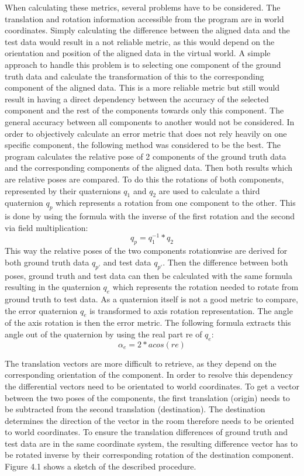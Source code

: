 \documentclass[hyperref,english,bachelorofscience,bibnum,twoside]{cgvpub}
\begin{document}
When calculating these metrics, several problems have to be considered. The translation and rotation information accessible from the program are in world coordinates. Simply calculating the difference between the aligned data and the test data would result in a not reliable metric, as this would depend on the orientation and position of the aligned data in the virtual world. A simple approach to handle this problem is to selecting one component of the ground truth data and calculate the transformation of this to the corresponding component of the aligned data. This is a more reliable metric but still would result in having a direct dependency between the accuracy of the selected component and the rest of the components towards only this component. The general accuracy between all components to another would not be considered. 
In order to objectively calculate an error metric that does not rely heavily on one specific component, the following method was considered to be the best. The program calculates the relative pose of 2 components of the ground truth data and the corresponding components of the aligned data. Then both results which are relative poses are compared. 
To do this the rotations of both components, represented by their quaternions $q_1$ and $q_2$ are used to calculate a third quaternion $q_p$ which represents a rotation from one component to the other. This is done by using the formula with the inverse of the first rotation and the second via field multiplication:
\[
q_p = q_1^{-1} * q_2
\]
This way the relative poses of the two components rotationwise are derived for both ground truth data $q_{p'}$ and test data $q_{p'}$. Then the difference between both poses, ground truth and test data can then be calculated with the same formula resulting in the quaternion $q_e$ which represents the rotation needed to rotate from ground truth to test data. As a quaternion itself is not a good metric to compare, the error quaternion $q_e$ is transformed to axis rotation representation. The angle of the axis rotation is then the error metric. 
The following formula extracts this angle out of the quaternion by using the real part re of $q_e$:%
\[
	\alpha_e = 2 *  acos ( re )
\]

The translation vectors are more difficult to retrieve, as they depend on the corresponding orientation of the component. In order to resolve this dependency the differential vectors need to be orientated to world coordinates. To get a vector between the two poses of the components, the first translation (origin) needs to be subtracted from the second translation (destination). The destination determines the direction of the vector in the room therefore needs to be oriented to world coordinates. To ensure the translation differences of ground truth and test data are in the same coordinate system, the resulting difference vector has to be rotated inverse by their corresponding rotation of the destination component. Figure 4.1 shows a sketch of the described procedure.
\end{document}
